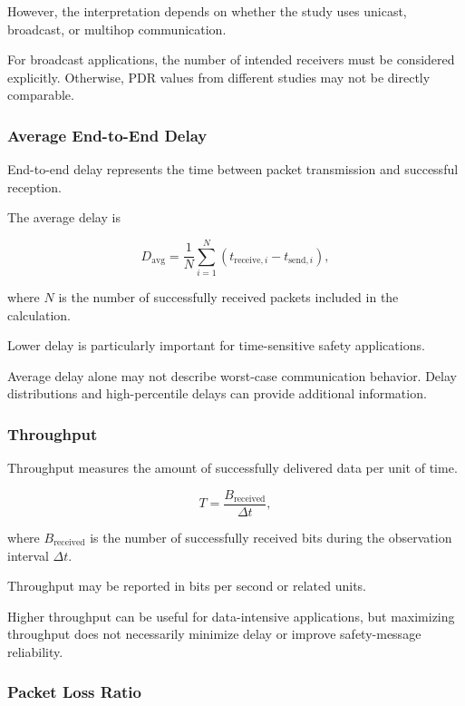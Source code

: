 However, the interpretation depends
on whether the study uses unicast,
broadcast, or multihop communication.

For broadcast applications,
the number of intended receivers
must be considered explicitly.
Otherwise, PDR values from
different studies may not
be directly comparable.

\subsubsection{Average End-to-End Delay}

End-to-end delay represents the
time between packet transmission
and successful reception.

The average delay is

\begin{equation}
D_{\mathrm{avg}} =
\frac{1}{N}
\sum_{i=1}^{N}
\left(
t_{\mathrm{receive},i}
-
t_{\mathrm{send},i}
\right),
\label{eq:delay}
\end{equation}

where $N$ is the number of
successfully received packets
included in the calculation.

Lower delay is particularly
important for time-sensitive
safety applications.

Average delay alone may not
describe worst-case communication
behavior. Delay distributions
and high-percentile delays
can provide additional information.

\subsubsection{Throughput}

Throughput measures the amount
of successfully delivered data
per unit of time.

\begin{equation}
T =
\frac{B_{\mathrm{received}}}
{\Delta t},
\label{eq:throughput}
\end{equation}

where $B_{\mathrm{received}}$
is the number of successfully
received bits during the
observation interval $\Delta t$.

Throughput may be reported in
bits per second or related units.

Higher throughput can be useful
for data-intensive applications,
but maximizing throughput does
not necessarily minimize delay
or improve safety-message
reliability.

\subsubsection{Packet Loss Ratio}

